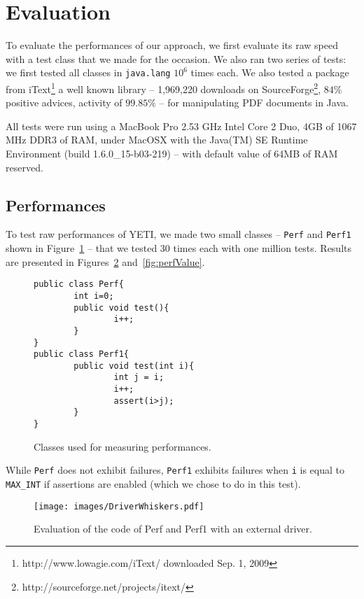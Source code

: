 \section{Evaluation}\label{sec:evaluation}

To evaluate the performances of our approach, we first evaluate its  raw speed with a test class that we made for the occasion. We also ran two series of tests: we first tested all classes in \texttt{java.lang} $10^{6}$ times each. We also tested a package from iText\footnote{http://www.lowagie.com/iText/ downloaded Sep. 1, 2009} a well known library -- 1,969,220 downloads on SourceForge\footnote{http://sourceforge.net/projects/itext/}, $84\%$ positive advices, activity of $99.85\%$ -- for manipulating PDF documents in Java. 

All tests were run using a MacBook Pro 2.53 GHz Intel Core 2 Duo, 4GB of 1067 MHz DDR3 of RAM, under MacOSX with the Java(TM) SE Runtime Environment (build 1.6.0\_15-b03-219) -- with default value of 64MB of RAM reserved. 

\subsection{Performances}

To test raw performances of YETI, we made two small classes -- \texttt{Perf} and \texttt{Perf1} shown in Figure~\ref{fig:perf} -- that we tested 30 times each with one million tests. Results are presented in Figures~\ref{fig:perfDriver} and~\ref{fig:perfValue}.

\begin{figure}[ht!]
{\small
\begin{verbatim}
public class Perf{
        int i=0;
        public void test(){
                i++;
        }
}
public class Perf1{
        public void test(int i){
                int j = i;
                i++;
                assert(i>j);
        }
}
\end{verbatim}
}
\caption{Classes used for measuring performances.}\label{fig:perf}
\end{figure}

While \texttt{Perf} does not exhibit failures, \texttt{Perf1} exhibits failures when \texttt{i} is equal to \texttt{MAX\_INT} if assertions are enabled (which we chose to do in this test).

\begin{figure}[ht!]
\begin{center}
\texttt{[image: images/DriverWhiskers.pdf]}
\end{center}
\caption{Evaluation of the code of Perf and Perf1 with an external driver.}\label{fig:perfDriver}
\end{figure}

